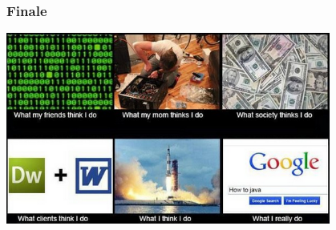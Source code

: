 \documentclass[10pt,pdf,hyperref={unicode}]{beamer}
\begin{document}
\begin{frame}
\frametitle{ Finale }

\center
	\includegraphics[width=0.8\textwidth]{./developer.png}

\end{frame}
\end{document}
